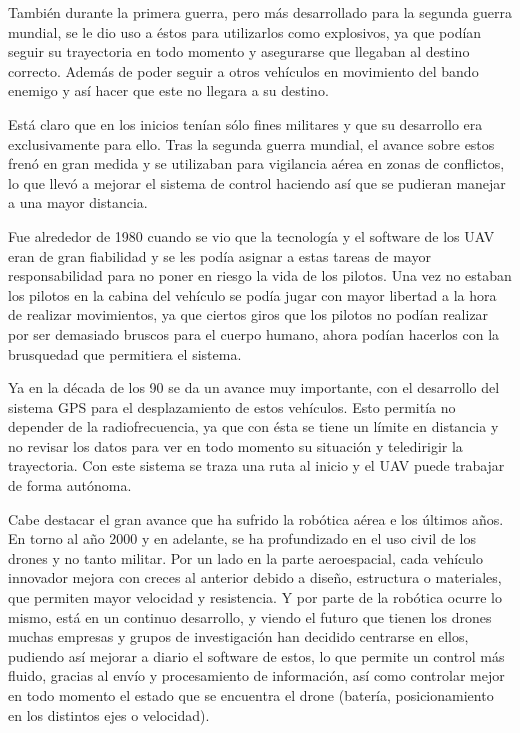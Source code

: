 \hspace{1cm} Tambi\'en durante la primera guerra, pero m\'as desarrollado para la segunda guerra mundial, se le dio uso a \'estos para utilizarlos como explosivos, ya que pod\'ian seguir su trayectoria en todo momento y asegurarse que llegaban al destino correcto. Adem\'as de poder seguir a otros veh\'iculos en movimiento del bando enemigo y as\'i hacer que este no llegara a su destino. 

\hspace{1cm} Est\'a claro que en los inicios ten\'ian s\'olo fines militares y que su desarrollo era exclusivamente para ello. Tras la segunda guerra mundial, el avance sobre estos fren\'o en gran medida y se utilizaban para vigilancia a\'erea en zonas de conflictos, lo que llev\'o a mejorar el sistema de control haciendo as\'i que se pudieran manejar a una mayor distancia. 

\hspace{1 cm}Fue alrededor de 1980 cuando se vio que la tecnolog\'ia y el software de los UAV eran de gran fiabilidad y se les pod\'ia asignar a estas tareas de mayor responsabilidad para no poner en riesgo la vida de los pilotos. Una vez no estaban los pilotos en la cabina del veh\'iculo se pod\'ia jugar con mayor libertad a la hora de realizar movimientos, ya que ciertos giros que los pilotos no pod\'ian realizar por ser demasiado bruscos para el cuerpo humano, ahora pod\'ian hacerlos con la brusquedad que permitiera el sistema.  

\hspace{1 cm} Ya en la d\'ecada de los 90 se da un avance muy importante, con el desarrollo del sistema GPS para el desplazamiento de estos veh\'iculos. Esto permit\'ia no depender de la radiofrecuencia, ya que con \'esta se tiene un l\'imite en distancia y no revisar los datos para ver en todo momento su situaci\'on y teledirigir la trayectoria. Con este sistema se traza una ruta al inicio y el UAV puede trabajar de forma aut\'onoma. 


\hspace{1cm} Cabe destacar el gran avance que ha sufrido la rob\'otica a\'erea e los \'ultimos años. En torno al año 2000 y en adelante, se ha profundizado en el uso civil de los drones y no tanto militar. Por un lado en la parte aeroespacial, cada veh\'iculo innovador mejora con creces al anterior debido a diseño, estructura o materiales, que permiten mayor velocidad y resistencia. Y por parte de la rob\'otica ocurre lo mismo, est\'a en un continuo desarrollo, y viendo el futuro que tienen los drones muchas empresas y grupos de investigaci\'on han decidido centrarse en ellos, pudiendo as\'i mejorar a diario el software de estos, lo que permite un control m\'as fluido, gracias al env\'io y procesamiento de informaci\'on, as\'i como controlar mejor en todo momento el estado que se encuentra el drone (bater\'ia, posicionamiento en los distintos ejes o velocidad). 
 

